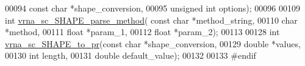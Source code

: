 \begin{DoxyCode}
00094                                     \textcolor{keyword}{const} \textcolor{keywordtype}{char} *shape\_conversion,
00095                                     \textcolor{keywordtype}{unsigned} \textcolor{keywordtype}{int} options);
00096 
00109 \textcolor{keywordtype}{int} \hyperlink{constraints__SHAPE_8h_a71b84eb0dd69e5c256f4ecf8f78cf314}{vrna\_sc\_SHAPE\_parse\_method}( \textcolor{keyword}{const} \textcolor{keywordtype}{char} *method\_string,
00110                                 \textcolor{keywordtype}{char} *method,
00111                                 \textcolor{keywordtype}{float} *param\_1,
00112                                 \textcolor{keywordtype}{float} *param\_2);
00113 
00128 \textcolor{keywordtype}{int} \hyperlink{group__SHAPE__reactivities_ga67675b3ed48744489a3bcfa4174197cb}{vrna\_sc\_SHAPE\_to\_pr}(\textcolor{keyword}{const} \textcolor{keywordtype}{char} *shape\_conversion,
00129                         \textcolor{keywordtype}{double} *values,
00130                         \textcolor{keywordtype}{int} length,
00131                         \textcolor{keywordtype}{double} default\_value);
00132 
00133 \textcolor{preprocessor}{#endif}
\end{DoxyCode}

